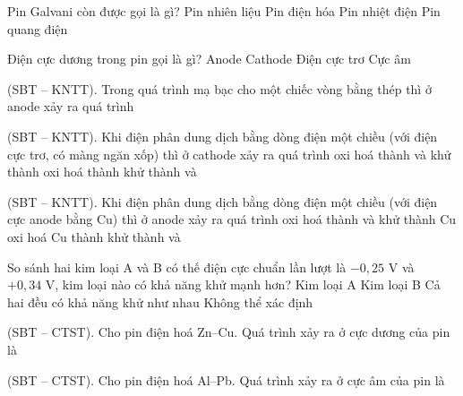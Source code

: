 \documentclass[11pt,a4paper]{article}
\def\loigiai#1{}
\begin{document}
\begin{ex}
Pin Galvani còn được gọi là gì?
\choice
{Pin nhiên liệu}
{Pin điện hóa}
{Pin nhiệt điện}
{Pin quang điện}
\loigiai{}
\end{ex}

\begin{ex}
Điện cực dương trong pin gọi là gì?
\choice
{Anode}
{Cathode}
{Điện cực trơ}
{Cực âm}
\loigiai{}
\end{ex}

\begin{ex}
(SBT – KNTT). Trong quá trình mạ bạc cho một chiếc vòng bằng thép thì ở anode xảy ra quá trình
\choice
{}
{}
{}
{}
\loigiai{}
\end{ex}

\begin{ex}
(SBT – KNTT). Khi điện phân dung dịch  bằng dòng điện một chiều (với điện cực trơ, có màng ngăn xốp) thì ở cathode xảy ra quá trình
\choice
{oxi hoá  thành  và }
{khử  thành }
{oxi hoá  thành }
{khử  thành  và }
\loigiai{}
\end{ex}

\begin{ex}
(SBT – KNTT). Khi điện phân dung dịch  bằng dòng điện một chiều (với điện cực anode bằng Cu) thì ở anode xảy ra quá trình
\choice
{oxi hoá  thành  và }
{khử  thành Cu}
{oxi hoá Cu thành }
{khử  thành  và }
\loigiai{}
\end{ex}

\begin{ex}
So sánh hai kim loại A và B có thế điện cực chuẩn lần lượt là $-0{,}25\text{ V}$ và $+0{,}34\text{ V}$, kim loại nào có khả năng khử mạnh hơn?
\choice
{Kim loại A}
{Kim loại B}
{Cả hai đều có khả năng khử như nhau}
{Không thể xác định}
\loigiai{}
\end{ex}

\begin{ex}
(SBT – CTST). Cho pin điện hoá Zn--Cu. Quá trình xảy ra ở cực dương của pin là
\choice
{}
{}
{}
{}
\loigiai{}
\end{ex}

\begin{ex}
(SBT – CTST). Cho pin điện hoá Al--Pb. Quá trình xảy ra ở cực âm của pin là
\choice
{}
{}
{}
{}
\loigiai{}
\end{ex}
\end{document}

